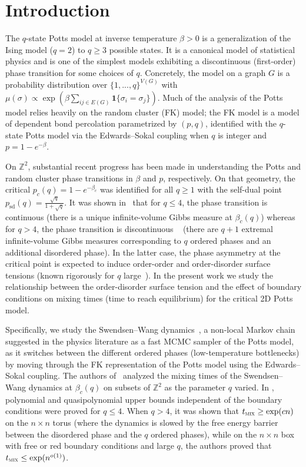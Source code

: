 \documentclass[reqno,11pt]{amsart}
\numberwithin{equation}{section}
\theoremstyle{definition}{
\newtheorem{example}[theorem]{Example}
\newtheorem{definition}[theorem]{Definition}
\newtheorem*{definition*}{Definition}
\newtheorem{problem}[theorem]{Problem}
\newtheorem{question}[theorem]{Question}
\newtheorem{remark}[theorem]{Remark}
}
\newcommand{\tmix}{t_{\textsc{mix}}}
\newcommand{\sd}{{\operatorname{sd}}}
\begin{document}
\section{Introduction}
The $q$-state Potts model at inverse temperature $\beta>0$ is a generalization of the Ising model ($q=2$) to $q\geq 3$ possible states. It is a canonical model of statistical physics and is one of the simplest models exhibiting a discontinuous (first-order) phase transition for some choices of $q$. Concretely, the model on a graph $G$ is a probability distribution over $\{1,...,q\}^{V(G)}$ with $\mu(\sigma)\propto \exp(\beta \sum_{ij\in E(G)} \boldsymbol 1\{\sigma_i=\sigma_j\})$.
Much of the analysis of the Potts model relies heavily on the random cluster (FK) model; the FK model is a model of dependent bond percolation parametrized by $(p,q)$, identified with the $q$-state Potts model via the Edwards--Sokal coupling \cite{EdSo88} when $q$ is integer and $p=1-e^{-\beta}$. 

On $\mathbb Z^2$, substantial recent progress has been made in understanding the Potts and random cluster phase transitions in $\beta$ and $p$, respectively.
On that geometry, the critical $p_c(q) = 1-e^{-\beta_c}$ was identified \cite{BeDu12} for all $q\geq 1$ with the self-dual point $p_\sd(q)= \frac {\sqrt q}{1+\sqrt q}$. 
It was shown in~\cite{DST15} that for $q\leq 4$, the phase transition is continuous (there is a unique infinite-volume Gibbs measure at $\beta_c(q)$) whereas for $q>4$, the phase transition is discontinuous ~\cite{DGHMT16} (there are $q+1$ extremal infinite-volume Gibbs measures corresponding to $q$ ordered phases and an additional disordered phase). In the latter case, the phase asymmetry at the critical point is expected to induce order-order and order-disorder surface tensions (known rigorously for $q$ large~\cite{LMMRS91,MMRS91}). In the present work we study the relationship between the order-disorder surface tension and the effect of boundary conditions on mixing times (time to reach equilibrium) for the critical 2D Potts model.

Specifically, we study the Swendsen--Wang dynamics~\cite{SW87}, a non-local Markov chain suggested in the physics literature as a fast MCMC sampler of the Potts model, as it switches between the different ordered phases (low-temperature bottlenecks) by moving through the FK representation of the Potts model using the Edwards--Sokal coupling.
The authors of~\cite{GL16a} analyzed the mixing times of the Swendsen--Wang dynamics at $\beta_c(q)$ on subsets of $\mathbb Z^2$ as the parameter $q$ varied. In \cite{GL16a}, polynomial and quasipolynomial upper bounds independent of the boundary conditions were proved for $q\leq 4$. When $q>4$, it was shown that $\tmix \geq \exp(cn)$ on the $n\times n$ torus (where the dynamics is slowed by the free energy barrier between the disordered phase and the $q$ ordered phases), while on the $n\times n$ box with free or red boundary conditions and large $q$, the authors proved that $\tmix \leq \exp(n^{o(1)})$.
\end{document}
